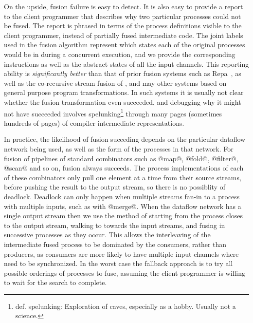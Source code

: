 On the upside, fusion failure is easy to detect. It is also easy to provide a report to the client programmer that describes why two particular processes could not be fused. The report is phrased in terms of the process definitions visible to the client programmer, instead of partially fused intermediate code. The joint labels used in the fusion algorithm represent which states each of the original processes would be in during a concurrent execution, and we provide the corresponding instructions as well as the abstract states of all the input channels. This reporting ability is \emph{significantly better} than that of prior fusion systems such as Repa~\cite{lippmeier2012:guiding}, as well as the co-recursive stream fusion of \cite{coutts2007stream}, and may other systems based on general purpose program transformations. In such systems it is usually not clear whether the fusion transformation even succeeded, and debugging why it might not have succeeded involves spelunking\footnote{def. spelunking: Exploration of caves, especially as a hobby. Usually not a science.} through many pages (sometimes hundreds of pages) of compiler intermediate representations.

In practice, the likelihood of fusion suceeding depends on the particular dataflow network being used, as well as the form of the processes in that network. For fusion of pipelines of standard combinators such as @map@, @fold@, @filter@, @scan@ and so on, fusion always succeeds. The process implementations of each of these combinators only pull one element at a time from their source streams, before pushing the result to the output stream, so there is no possiblity of deadlock. Deadlock can only happen when multiple streams fan-in to a process with multiple inputs, such as with @merge@. When the dataflow network has a single output stream then we use the method of starting from the process closes to the output stream, walking to towards the input streams, and fusing in successive processes as they occur. This allows the interleaving of the intermediate fused process to be dominated by the consumers, rather than producers, as consumers are more likely to have multiple input channels where need to be synchronized. In the worst case the fallback approach is to try all possible orderings of processes to fuse, assuming the client programmer is willing to wait for the search to complete. 







